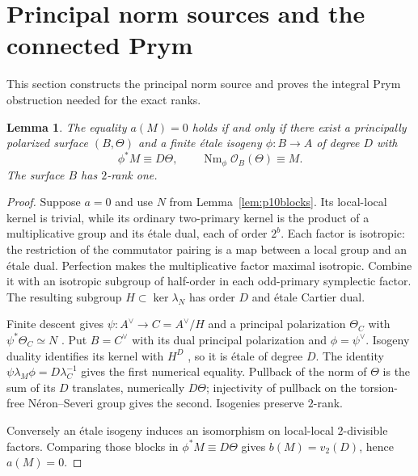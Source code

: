 \documentclass[11pt]{article}
\newtheorem{lemma}[theorem]{Lemma}
\theoremstyle{definition}\newtheorem{definition}[theorem]{Definition}
\theoremstyle{remark}\newtheorem{remark}[theorem]{Remark}
\newcommand{\OO}{\mathcal O}
\newcommand{\Nm}{\operatorname{Nm}}
\begin{document}
\section{Principal norm sources and the connected Prym}

This section constructs the principal norm source and proves the integral Prym obstruction needed for the exact ranks.

\begin{lemma}\label{lem:p10source}
The equality $a(M)=0$ holds if and only if there exist a principally polarized surface $(B,\Theta)$ and a finite \'etale isogeny $\phi:B\to A$ of degree $D$ with
\[
 \phi^*M\equiv D\Theta,\qquad \Nm_\phi\OO_B(\Theta)\equiv M.
\]
The surface $B$ has $2$-rank one.
\end{lemma}
\begin{proof}
Suppose $a=0$ and use $N$ from Lemma~\ref{lem:p10blocks}. Its local-local kernel is trivial, while its ordinary two-primary kernel is the product of a multiplicative group and its \'etale dual, each of order $2^b$. Each factor is isotropic: the restriction of the commutator pairing is a map between a local group and an \'etale dual. Perfection makes the multiplicative factor maximal isotropic. Combine it with an isotropic subgroup of half-order in each odd-primary symplectic factor. The resulting subgroup $H\subset\ker\lambda_N$ has order $D$ and \'etale Cartier dual.

Finite descent gives $\psi:A^\vee\to C=A^\vee/H$ and a principal polarization $\Theta_C$ with $\psi^*\Theta_C\simeq N$ \citep[Proposition~8.19 and proof, p.~119]{EGM}. Put $B=C^\vee$ with its dual principal polarization and $\phi=\psi^\vee$. Isogeny duality identifies its kernel with $H^D$ \citep[Theorem~7.5, p.~100]{EGM}, so it is \'etale of degree $D$. The identity $\psi\lambda_M\phi=D\lambda_C^{-1}$ gives the first numerical equality. Pullback of the norm of $\Theta$ is the sum of its $D$ translates, numerically $D\Theta$; injectivity of pullback on the torsion-free N\'eron--Severi group gives the second. Isogenies preserve $2$-rank.

Conversely an \'etale isogeny induces an isomorphism on local-local $2$-divisible factors. Comparing those blocks in $\phi^*M\equiv D\Theta$ gives $b(M)=v_2(D)$, hence $a(M)=0$.
\end{proof}
\end{document}
